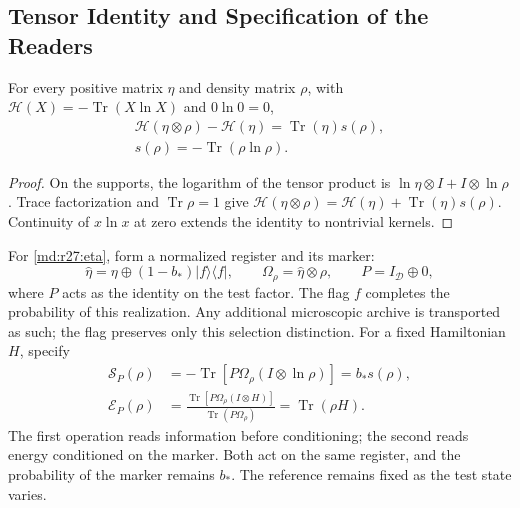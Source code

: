 \subsection{Tensor Identity and Specification of the Readers}
\label{md:r27:lectores}
\begin{lemma}
For every positive matrix $\eta$ and density matrix $\rho$, with
$\mathscr H(X)=-\operatorname{Tr}(X\ln X)$ and $0\ln0=0$,
\begin{equation}
 \begin{gathered}
 \mathscr H(\eta\otimes\rho)-\mathscr H(\eta)
 =\operatorname{Tr}(\eta)s(\rho),\\
 s(\rho)=-\operatorname{Tr}(\rho\ln\rho).
 \end{gathered}
 \label{md:r27:tensor}
\end{equation}
\end{lemma}
\begin{proof}
On the supports, the logarithm of the tensor product is
$\ln\eta\otimes I+I\otimes\ln\rho$. Trace factorization and
$\operatorname{Tr}\rho=1$ give
$\mathscr H(\eta\otimes\rho)=\mathscr H(\eta)+\operatorname{Tr}(\eta)s(\rho)$.
Continuity of $x\ln x$ at zero extends the identity to nontrivial kernels.
\end{proof}

For \eqref{md:r27:eta}, form a normalized register and its marker:
\begin{equation}
 \widehat\eta=\eta\oplus(1-b_*)|f\rangle\langle f|,
 \qquad\Omega_\rho=\widehat\eta\otimes\rho,\qquad
 P=I_{\mathcal D}\oplus0,
 \label{md:r27:registro}
\end{equation}
where $P$ acts as the identity on the test factor. The flag $f$ completes
the probability of this realization. Any additional microscopic archive
is transported as such; the flag preserves only this selection distinction.
For a fixed Hamiltonian $H$, specify
\begin{equation}
 \begin{split}
 \mathcal S_P(\rho)&=-\operatorname{Tr}
 [P\Omega_\rho(I\otimes\ln\rho)]=b_*s(\rho),\\
 \mathcal E_P(\rho)&=
 \frac{\operatorname{Tr}[P\Omega_\rho(I\otimes H)]}
 {\operatorname{Tr}(P\Omega_\rho)}=\operatorname{Tr}(\rho H).
 \end{split}
 \label{md:r27:par-lector}
\end{equation}
The first operation reads information before conditioning; the second
reads energy conditioned on the marker. Both act on the same register,
and the probability of the marker remains $b_*$. The reference remains
fixed as the test state varies.

